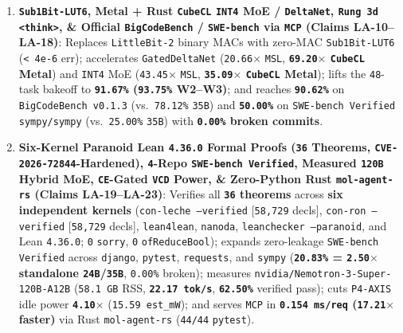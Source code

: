 \documentclass[10pt]{article}
\begin{document}
\begin{enumerate}
  \item \textbf{\texttt{Sub1Bit-LUT6}, Metal + Rust \texttt{CubeCL} \texttt{INT4} MoE / \texttt{DeltaNet}, \texttt{Rung 3d} \texttt{<think>}, \& Official \texttt{BigCodeBench} / \texttt{SWE-bench} via \texttt{MCP} (Claims LA-10--LA-18)}: Replaces \texttt{LittleBit-2} binary MACs with zero-MAC \texttt{Sub1Bit-LUT6} (\texttt{< 4e-6} err); accelerates \texttt{GatedDeltaNet} (\texttt{20.66$\times$} \texttt{MSL}, \textbf{\texttt{69.20$\times$} \texttt{CubeCL} Metal}) and \texttt{INT4} MoE (\texttt{43.45$\times$} \texttt{MSL}, \textbf{\texttt{35.09$\times$} \texttt{CubeCL} Metal}); lifts the \texttt{48}-task bakeoff to \textbf{\texttt{91.67\%} (\texttt{93.75\%} W2--W3)}; and reaches \textbf{\texttt{90.62\%}} on \texttt{BigCodeBench v0.1.3} (vs.\ \texttt{78.12\%} \texttt{35B}) and \textbf{\texttt{50.00\%}} on \texttt{SWE-bench Verified} \texttt{sympy/sympy} (vs.\ \texttt{25.00\%} \texttt{35B}) with \textbf{\texttt{0.00\%} broken commits}.
  \item \textbf{Six-Kernel Paranoid Lean \texttt{4.36.0} Formal Proofs (\texttt{36} Theorems, \texttt{CVE-2026-72844}-Hardened), \texttt{4}-Repo \texttt{SWE-bench Verified}, Measured \texttt{120B} Hybrid MoE, \texttt{CE}-Gated \texttt{VCD} Power, \& Zero-Python Rust \texttt{mol-agent-rs} (Claims LA-19--LA-23)}: Verifies all \textbf{\texttt{36} theorems} across \textbf{six independent kernels} (\texttt{con-leche --verified} [\texttt{58,729} decls], \texttt{con-ron --verified} [\texttt{58,729} decls], \texttt{lean4lean}, \texttt{nanoda}, \texttt{leanchecker --paranoid}, and Lean \texttt{4.36.0}; \texttt{0} \texttt{sorry}, \texttt{0} \texttt{ofReduceBool}); expands zero-leakage \texttt{SWE-bench Verified} across \texttt{django}, \texttt{pytest}, \texttt{requests}, and \texttt{sympy} (\textbf{\texttt{20.83\%} = \texttt{2.50$\times$} standalone \texttt{24B}/\texttt{35B}}, \texttt{0.00\%} broken); measures \texttt{nvidia/Nemotron-3-Super-120B-A12B} (\texttt{58.1 GB} RSS, \textbf{\texttt{22.17 tok/s}}, \textbf{\texttt{62.50\%}} verified pass); cuts \texttt{P4-AXIS} idle power \textbf{\texttt{4.10$\times$}} (\texttt{15.59 est\_mW}); and serves \texttt{MCP} in \textbf{\texttt{0.154 ms/req} (\texttt{17.21$\times$} faster)} via Rust \texttt{mol-agent-rs} (\texttt{44/44} \texttt{pytest}).

\end{enumerate}
\end{document}
